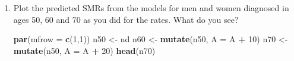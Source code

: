 \documentclass[
]{book}
\newenvironment{Shaded}{\begin{snugshade}}{\end{snugshade}}
\newcommand{\AttributeTok}[1]{\textcolor[rgb]{0.13,0.29,0.53}{#1}}
\newcommand{\DecValTok}[1]{\textcolor[rgb]{0.00,0.00,0.81}{#1}}
\newcommand{\FunctionTok}[1]{\textcolor[rgb]{0.13,0.29,0.53}{\textbf{#1}}}
\newcommand{\NormalTok}[1]{#1}
\newcommand{\OtherTok}[1]{\textcolor[rgb]{0.56,0.35,0.01}{#1}}
\newcommand{\SpecialCharTok}[1]{\textcolor[rgb]{0.81,0.36,0.00}{\textbf{#1}}}
\newcommand{\StringTok}[1]{\textcolor[rgb]{0.31,0.60,0.02}{#1}}
\begin{document}
\begin{enumerate}
\begin{Shaded}
\begin{Highlighting}[]
\NormalTok{Fsmr }\OtherTok{\textless{}{-}} \FunctionTok{update}\NormalTok{(Msmr, }\AttributeTok{data =} \FunctionTok{subset}\NormalTok{(SLr, E }\SpecialCharTok{\textgreater{}} \DecValTok{0} \SpecialCharTok{\&}\NormalTok{ sex }\SpecialCharTok{==} \StringTok{"F"}\NormalTok{))}
\end{Highlighting}
\end{Shaded}

  Plot the estimated smooth effects for both men and women using
  e.g.~\texttt{plot.gam}. What do you see?

\begin{Shaded}
\begin{Highlighting}[]
\FunctionTok{par}\NormalTok{(}\AttributeTok{mfcol =} \FunctionTok{c}\NormalTok{(}\DecValTok{3}\NormalTok{, }\DecValTok{2}\NormalTok{))}
\FunctionTok{plot}\NormalTok{(Msmr, }\AttributeTok{ylim =} \FunctionTok{c}\NormalTok{(}\SpecialCharTok{{-}}\DecValTok{3}\NormalTok{, }\DecValTok{3}\NormalTok{), }\AttributeTok{col =} \StringTok{"blue"}\NormalTok{, }\AttributeTok{lwd =} \DecValTok{2}\NormalTok{)}
\FunctionTok{plot}\NormalTok{(Fsmr, }\AttributeTok{ylim =} \FunctionTok{c}\NormalTok{(}\SpecialCharTok{{-}}\DecValTok{3}\NormalTok{, }\DecValTok{3}\NormalTok{), }\AttributeTok{col =} \StringTok{"red"}\NormalTok{ , }\AttributeTok{lwd =} \DecValTok{2}\NormalTok{)}
\end{Highlighting}
\end{Shaded}
\item
  Plot the predicted SMRs from the models for men and women
  diagnosed in ages 50, 60 and 70 as you did for the rates. What do
  you see?

\begin{Shaded}
\begin{Highlighting}[]
\FunctionTok{par}\NormalTok{(}\AttributeTok{mfrow =} \FunctionTok{c}\NormalTok{(}\DecValTok{1}\NormalTok{,}\DecValTok{1}\NormalTok{))}
\NormalTok{n50 }\OtherTok{\textless{}{-}}\NormalTok{ nd}
\NormalTok{n60 }\OtherTok{\textless{}{-}} \FunctionTok{mutate}\NormalTok{(n50, }\AttributeTok{A =}\NormalTok{ A }\SpecialCharTok{+} \DecValTok{10}\NormalTok{)}
\NormalTok{n70 }\OtherTok{\textless{}{-}} \FunctionTok{mutate}\NormalTok{(n50, }\AttributeTok{A =}\NormalTok{ A }\SpecialCharTok{+} \DecValTok{20}\NormalTok{)}
\FunctionTok{head}\NormalTok{(n70)}
\end{Highlighting}
\end{Shaded}


\end{enumerate}
\end{document}
